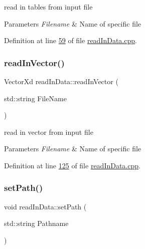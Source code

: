 read in tables from input file 


\begin{DoxyParams}{Parameters}
{\em Filename} & Name of specific file \\
\hline
\end{DoxyParams}


Definition at line \hyperlink{read_in_data_8cpp_source_l00059}{59} of file \hyperlink{read_in_data_8cpp_source}{read\+In\+Data.\+cpp}.

\mbox{\label{classread_in_data_ab57aff38529234593d786ecace301cf7}} 
\subsubsection{\texorpdfstring{read\+In\+Vector()}{readInVector()}}
{\footnotesize\ttfamily Vector\+Xd read\+In\+Data\+::read\+In\+Vector (\begin{DoxyParamCaption}\item[{std\+::string}]{File\+Name }\end{DoxyParamCaption})}



read in vector from input file 


\begin{DoxyParams}{Parameters}
{\em Filename} & Name of specific file \\
\hline
\end{DoxyParams}


Definition at line \hyperlink{read_in_data_8cpp_source_l00125}{125} of file \hyperlink{read_in_data_8cpp_source}{read\+In\+Data.\+cpp}.

\mbox{\label{classread_in_data_ad67d566fd837f6d721db279144d484e0}} 
\subsubsection{\texorpdfstring{set\+Path()}{setPath()}}
{\footnotesize\ttfamily void read\+In\+Data\+::set\+Path (\begin{DoxyParamCaption}\item[{std\+::string}]{Pathname }\end{DoxyParamCaption})}



